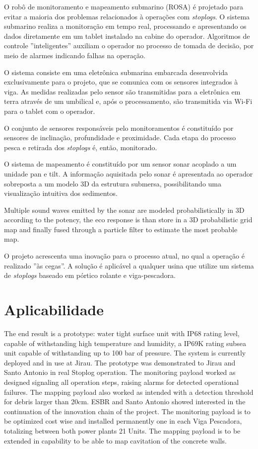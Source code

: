 O robô de monitoramento e mapeamento submarino (ROSA) é projetado para evitar a
maioria dos problemas relacionados à operações com \textit{stoplogs}. O sistema
submarino realiza a monitoração em tempo real, processando e apresentando os
dados diretamente em um tablet instalado na cabine do operador. Algoritmos de
controle ''inteligentes'' auxiliam o operador no processo de tomada de decisão,
por meio de alarmes indicando falhas na operação.

O sistema consiste em uma eletrônica submarina embarcada desenvolvida
exclusivamente para o projeto, que se comunica com os sensores integrados à
viga. As medidas realizadas pelo sensor são transmitidas para a
eletrônica em terra através de um umbilical e, após o processamento, são
transmitida via Wi-Fi para o tablet com o operador.

O conjunto de sensores responsáveis pelo monitoramentos é constituído por
sensores de inclinação, profundidade e proximidade. Cada etapa do processo pesca
e retirada dos \textit{stoplogs} é, então, monitorado.

O sistema de mapeamento é constituído por um sensor sonar acoplado a um unidade
pan e tilt. A informação aquisitada pelo sonar é apresentada ao operador
sobreposta a um modelo 3D da estrutura submersa, possibilitando uma visualização
intuitiva dos sedimentos.

  Multiple sound waves emitted by the sonar are modeled probabilistically in 
 3D according to the potency, the eco response is than store in a 3D probabilistic 
 grid map and finally fused through a particle filter to estimate the most probable map.

O projeto acrescenta uma inovação para o processo atual, no qual a operação é
realizado ''às cegas''. A solução é aplicável a qualquer usina que utilize um
sistema de \textit{stoplogs} baseado em pórtico rolante e viga-pescadora.


\chapter{Aplicabilidade}

The end result is a prototype: water tight surface unit with IP68 rating level, 
capable of withstanding high temperature and humidity, a IP69K rating subsea unit 
capable of withstanding up to 100 bar of pressure. The system is currently 
deployed and in use at Jirau.
	The prototype was demonstrated to Jirau and Santo Antonio in real Stoplog 
	operation. The monitoring payload worked as designed signaling all operation 
	steps, raising alarms for detected operational failures. The mapping payload 
	also worked as intended with a detection threshold for debris larger than 20cm. 
	ESBR and Santo Antonio showed interested in the continuation of the innovation 
	chain of the project. The monitoring payload is to be optimized cost wise 
	and installed permanently one in each Viga Pescadora, totalizing between 
	both power plants 21 Units. The mapping payload is to be extended in capability 
	to be able to map cavitation of the concrete walls. 
